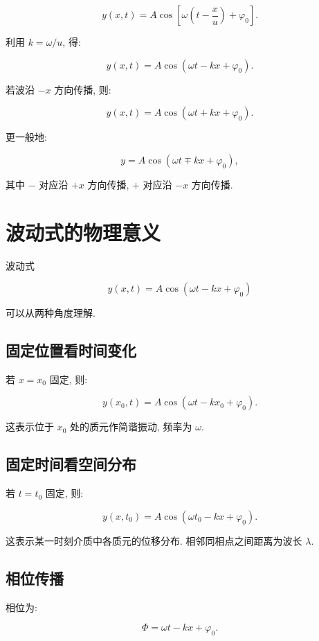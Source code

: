 \documentclass[
  a4paper,
]{ctexrep}
\begin{document}
\[
y(x,t)=A\cos\left[\omega\left(t-\frac{x}{u}\right)+\varphi_0\right].
\]

利用 \(k=\omega/u\), 得:

\[
y(x,t)=A\cos(\omega t-kx+\varphi_0).
\]

若波沿 \(-x\) 方向传播, 则:

\[
y(x,t)=A\cos(\omega t+kx+\varphi_0).
\]

更一般地:

\[
y=A\cos(\omega t\mp kx+\varphi_0),
\]

其中 \(-\) 对应沿 \(+x\) 方向传播, \(+\) 对应沿 \(-x\) 方向传播.

\section{波动式的物理意义}\label{ux6ce2ux52a8ux5f0fux7684ux7269ux7406ux610fux4e49}

波动式

\[
y(x,t)=A\cos(\omega t-kx+\varphi_0)
\]

可以从两种角度理解.

\subsection{固定位置看时间变化}\label{ux56faux5b9aux4f4dux7f6eux770bux65f6ux95f4ux53d8ux5316}

若 \(x=x_0\) 固定, 则:

\[
y(x_0,t)=A\cos(\omega t-kx_0+\varphi_0).
\]

这表示位于 \(x_0\) 处的质元作简谐振动, 频率为 \(\omega\).

\subsection{固定时间看空间分布}\label{ux56faux5b9aux65f6ux95f4ux770bux7a7aux95f4ux5206ux5e03}

若 \(t=t_0\) 固定, 则:

\[
y(x,t_0)=A\cos(\omega t_0-kx+\varphi_0).
\]

这表示某一时刻介质中各质元的位移分布. 相邻同相点之间距离为波长
\(\lambda\).

\subsection{相位传播}\label{ux76f8ux4f4dux4f20ux64ad}

相位为:

\[
\Phi=\omega t-kx+\varphi_0.
\]
\end{document}
